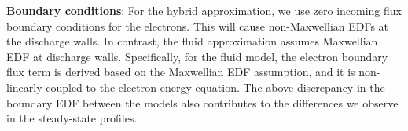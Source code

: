 \textbf{Boundary conditions}: For the hybrid approximation, we use zero incoming flux boundary conditions for the electrons. This will cause non-Maxwellian EDFs at the discharge walls. In contrast, the fluid approximation assumes Maxwellian EDF at discharge walls. Specifically, for the fluid model, the electron boundary flux term is derived based on the Maxwellian EDF assumption, and it is non-linearly coupled to the electron energy equation. The above discrepancy in the boundary EDF between the models also contributes to the differences we observe in the steady-state profiles. 




 







